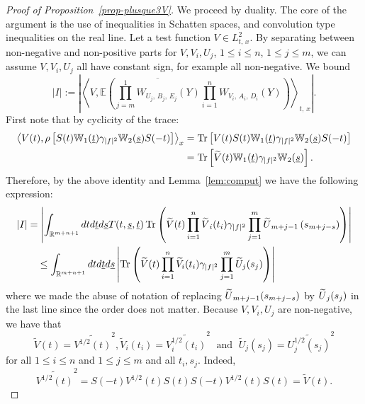 \documentclass[10pt]{amsart}
\theoremstyle{definition}\newtheorem{defi}[theo]{Definition}\newtheorem{rema}[theo]{Remark}\newtheorem{exam}[theo]{Example}\newtheorem{exem}[theo]{Example}\newtheorem{nota}[theo]{Notation}
\newcommand{\R}{\mathbb{R}}
\newcommand{\E}{\mathbb{E}}
\newcommand{\bbW}{\mathbb{W}}
\DeclareMathOperator{\Tr}{Tr}
\let\oldtilde\tilde
\renewcommand*{\tilde}[1]{\mathchoice{\widetilde{#1}}{\widetilde{#1}}{\oldtilde{#1}}{\oldtilde{#1}}}
\begin{document}
\begin{proof}[Proof of Proposition~\ref{prop-plusque3V}]
We proceed by duality. The core of the argument is the use of inequalities in Schatten spaces, and convolution type inequalities on the real line. Let a test function $V \in L^2_{t,\,x}$. By separating between non-negative and non-positive parts for $V,V_i, U_j$, $1\leq i\leq n$, $1\leq j\leq m$, we can assume $V,V_i,U_j$ all have constant sign, for example all non-negative. We bound
\[
|I| := \left|\left\langle V,\E \left(\overline{ \prod_{j=m}^1 W_{U_j,\,B_j,\,E_j} (Y)} \prod_{i=1}^n W_{V_i,\,A_i,\,D_i}(Y)\right) \right\rangle_{t,\,x}\right|.
\]
First note that by cyclicity of the trace:
\begin{align*}
\left\langle V(t),\rho \left[S(t) \bbW_1(\underline t) \gamma_{|f|^2} \bbW_2(\underline s)S(-t) \right]\right\rangle_x&=\Tr\left[V(t)S(t) \bbW_1(\underline t) \gamma_{|f|^2} \bbW_2(\underline s)S(-t) \right] \\
&=\Tr \left[\tilde V(t) \bbW_1(\underline t) \gamma_{|f|^2} \bbW_2(\underline s) \right].
\end{align*}
Therefore, by the above identity and Lemma~\ref{lem:comput} we have the following expression:
\begin{align*}
|I| &= \left|\int_{\R^{m+n+1}} dt d\underline t d\underline s T(t,\underline s, \underline t) \Tr\left(\tilde V(t) \prod_{i=1}^n \tilde V_i(t_i) \gamma_{|f|^2} \prod_{j=1}^m \tilde U_{m+j-1}\left(s_{m+j-s}\right)\right)\right|\\
&\quad \leq \int_{\R^{m+n+1}} dtd\underline t d\underline s \left| \Tr\left(\widetilde V(t) \prod_{i=1}^n \widetilde V_i(t_i) \gamma_{|f|^2} \prod_{j=1}^m \widetilde U_j(s_j)\right)\right|
\end{align*}
where we made the abuse of notation of replacing $\tilde U_{m+j-1}(s_{m+j-s})$ by $\tilde U_{j}(s_{j})$ in the last line since the order does not matter. Because $V,V_i,U_j$ are non-negative, we have that
\[
\widetilde V (t)= \widetilde{V^{1/2}(t)}^2, \widetilde V_i (t_i) = \widetilde{V^{1/2}_i(t_i)}^2\; \text{ and }\;\widetilde U_j(s_j) = \widetilde{U_j^{1/2}(s_j)}^2
\]
for all $1\leq i\leq n$ and $1\leq j\leq m$ and all $t_i,s_j$. Indeed,
\[
\widetilde{V^{1/2}(t)}^2 = S(-t) V^{1/2}(t) S(t) S(-t) V^{1/2} (t)S(t) = \widetilde V(t).
\]


\end{proof}
\end{document}
